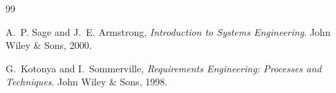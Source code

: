\begin{thebibliography}{99}

A.~P. Sage and J.~E. Armstrong, \emph{Introduction to Systems Engineering}. John Wiley \& Sons, 2000.

G.~Kotonya and I.~Sommerville, \emph{Requirements Engineering: Processes and Techniques}. John Wiley \& Sons, 1998.



\end{thebibliography}

